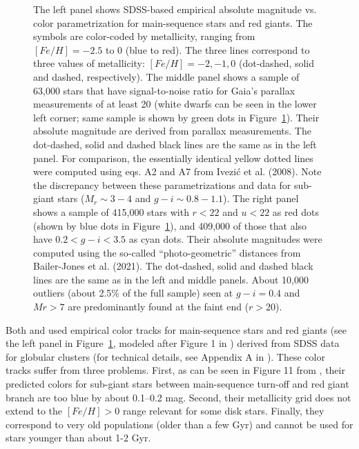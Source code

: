 \begin{figure}[b!]
\caption{The left panel shows SDSS-based empirical absolute magnitude vs. color parametrization for main-sequence stars and red giants.
The symbols are color-coded by metallicity, ranging from $[Fe/H] = -2.5$ to 0 (blue to red). The three lines correspond to three values of
metallicity: $[Fe/H] = -2, -1, 0$ (dot-dashed, solid and dashed, respectively). The middle panel shows a sample of 63,000 stars that have
signal-to-noise ratio for Gaia’s parallax measurements of at least 20 (white dwarfs can be seen in the lower left corner; same sample is
shown by green dots in Figure~\ref{fig:3HRdiags}). Their absolute magnitude are derived from parallax measurements. The dot-dashed,
solid and dashed black lines are the same as in the left panel. For comparison, the essentially identical yellow dotted lines were computed
using eqs. A2 and A7 from Ivezi\'{c} et al. (2008). Note the discrepancy between these parametrizations and data for sub-giant stars ($M_r \sim 3-4$
and $g-i \sim 0.8-1.1$). The right panel shows a sample of 415,000 stars with $r < 22$ and $u<22$ as red dots (shown by blue dots in Figure~\ref{fig:3HRdiags}), and 409,000 of those that also have  $0.2 < g-i < 3.5$ as cyan dots. Their absolute magnitudes were computed
using the so-called “photo-geometric” distances from Bailer-Jones et al. (2021). The dot-dashed, solid and dashed black lines are the
same as in the left and middle panels. About 10,000 outliers (about 2.5\% of the full
sample) seen at $g-i = 0.4$ and $Mr > 7$ are predominantly found at the faint end ($r>20$).}
\label{fig:3HRdiags}
\end{figure}


Both \cite{2012ApJ...757..166B} and \cite{2014ApJ...783..114G} used empirical color tracks for main-sequence stars
and red giants (see the left panel in Figure~\ref{fig:3HRdiags}, modeled after Figure 1 in \citealt{2014ApJ...783..114G})
derived from SDSS data for globular clusters (for technical details, see
Appendix A in \citealt{2008ApJ...684..287I}). These color tracks suffer from three problems. First, as can be seen in Figure 11 from
\cite{2014ApJ...783..114G}, their predicted colors for sub-giant stars between main-sequence turn-off and red giant branch are too blue by
about 0.1--0.2 mag. Second, their metallicity grid does not extend to the $[Fe/H]>0$ range relevant for some disk stars. Finally, they
correspond to very old populations (older than a few Gyr) and cannot be used for stars younger than about 1-2 Gyr. 

